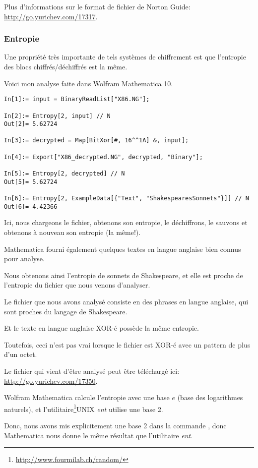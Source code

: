 Plus d'informations sur le format de fichier de Norton Guide: \url{http://go.yurichev.com/17317}.

\subsubsection{Entropie}

Une propriété très importante de tels systèmes de chiffrement est que l'entropie
des blocs chiffrés/déchiffrés est la même.

Voici mon analyse faite dans Wolfram Mathematica 10.

\begin{lstlisting}[caption=Wolfram Mathematica 10,style=custommath]
In[1]:= input = BinaryReadList["X86.NG"];

In[2]:= Entropy[2, input] // N
Out[2]= 5.62724

In[3]:= decrypted = Map[BitXor[#, 16^^1A] &, input];

In[4]:= Export["X86_decrypted.NG", decrypted, "Binary"];

In[5]:= Entropy[2, decrypted] // N
Out[5]= 5.62724

In[6]:= Entropy[2, ExampleData[{"Text", "ShakespearesSonnets"}]] // N
Out[6]= 4.42366
\end{lstlisting}

Ici, nous chargeons le fichier, obtenons son entropie, le déchiffrons, le sauvons
et obtenons à nouveau son entropie (la même!).

Mathematica fourni également quelques textes en langue anglaise bien connus pour
analyse.

Nous obtenons ainsi l'entropie de sonnets de Shakespeare, et elle est proche de l'entropie
du fichier que nous venons d'analyser.

Le fichier que nous avons analysé consiste en des phrases en langue anglaise, qui
sont proches du langage de Shakespeare.

Et le texte en langue anglaise XOR-é possède la même entropie.

Toutefois, ceci n'est pas vrai lorsque le fichier est XOR-é avec un pattern de plus
d'un octet.

Le fichier qui vient d'être analysé peut être téléchargé ici: \url{http://go.yurichev.com/17350}.


\newcommand{\FNENTURL}{\footnote{\url{http://www.fourmilab.ch/random/}}}

Wolfram Mathematica calcule l'entropie avec une base $e$ (base des logarithmes naturels),
et l'utilitaire\FNENTURL UNIX \emph{ent} utilise une base 2.

Donc, nous avons mis explicitement une base 2 dans la commande , donc
Mathematica nous donne le même résultat que l'utilitaire \emph{ent}.

